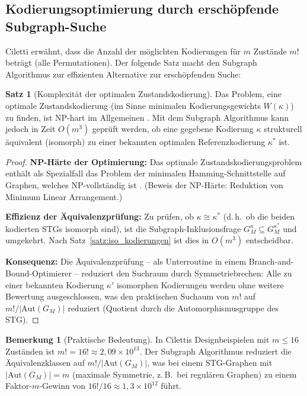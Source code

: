 ﻿\documentclass[a4paper,12pt]{article}
\theoremstyle{definition}
\newtheorem{satz}{Satz}
\newtheorem{bemerkung}{Bemerkung}
\begin{document}
\subsection{Kodierungsoptimierung durch erschöpfende Subgraph-Suche}

Ciletti \cite[S.~107]{ciletti2011} erwähnt, dass die Anzahl der möglichten Kodierungen
für $m$ Zustände $m!$ beträgt (alle Permutationen). Der folgende Satz macht den
Subgraph Algorithmus zur effizienten Alternative zur erschöpfenden Suche:

\begin{satz}[Komplexität der optimalen Zustandskodierung]\label{satz:kodzkomp}
  Das Problem, eine optimale Zustandskodierung (im Sinne minimalen Kodierungsgewichts
  $W(\kappa)$) zu finden, ist NP-hart im Allgemeinen \cite[S.~107]{ciletti2011}.
  Mit dem Subgraph Algorithmus kann jedoch in Zeit $O(m^3)$ geprüft werden, ob eine
  gegebene Kodierung $\kappa$ strukturell äquivalent (isomorph) zu einer bekannten
  optimalen Referenzkodierung $\kappa^*$ ist.
\end{satz}

\begin{proof}
  \textbf{NP-Härte der Optimierung:} Das optimale Zustandskodierungsproblem enthält als
  Spezialfall das Problem der minimalen Hamming-Schnittstelle auf Graphen, welches
  NP-vollständig ist \cite{garey1979computers}. (Beweis der NP-Härte: Reduktion von
  Minimum Linear Arrangement.)

  \textbf{Effizienz der Äquivalenzprüfung:} Zu prüfen, ob $\kappa \cong \kappa^*$
  (d.\,h.\ ob die beiden kodierten STGs isomorph sind), ist die Subgraph-Inklusionsfrage
  $G_M^\kappa \subseteq G_M^{\kappa^*}$ und umgekehrt. Nach
  Satz~\ref{satz:iso_kodierungen} ist dies in $O(m^3)$ entscheidbar.

  \textbf{Konsequenz:} Die Äquivalenzprüfung -- als Unterroutine in einem
  Branch-and-Bound-Optimierer -- reduziert den Suchraum durch Symmetriebrechen:
  Alle zu einer bekannten Kodierung $\kappa'$ isomorphen Kodierungen werden ohne weitere
  Bewertung ausgeschlossen, was den praktischen Suchaum von $m!$ auf $m!/|\text{Aut}(G_M)|$
  reduziert (Quotient durch die Automorphismusgruppe des STG).
\end{proof}

\begin{bemerkung}[Praktische Bedeutung]\label{bem:kodpraktik}
  In Cilettis Designbeispielen \cite[Kap.~3]{ciletti2011} mit $m \leq 16$ Zuständen
  ist $m! = 16! \approx 2{,}09 \times 10^{13}$. Der Subgraph Algorithmus reduziert
  die Äquivalenzklassen auf $m!/|\text{Aut}(G_M)|$, was bei einem STG-Graphen mit
  $|\text{Aut}(G_M)| = m$ (maximale Symmetrie, z.\,B.\ bei regulären Graphen) zu einem
  Faktor-$m$-Gewinn von $16! / 16 \approx 1{,}3 \times 10^{12}$ führt.
\end{bemerkung}
\end{document}
